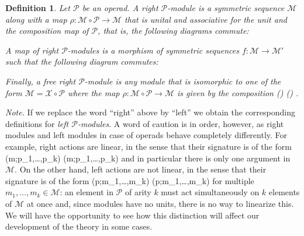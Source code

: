\documentclass[fleqn, a4paper, twoside]{article}
\makeatletter
\newcommand{\0}{\langle 0\rangle}
\newcommand{\XX}{\mathcal{X}}
\let\[\@undefined
\DeclareRobustCommand{\[}{\begin{equation}}%
\let\]\@undefined
\DeclareRobustCommand{\]}{\end{equation}}%
\theoremstyle{mytheorem}
\theoremstyle{introthm}
\theoremstyle{mydefinition}
\newtheorem{definition}[theorem]{Definition}
\theoremstyle{mydefinition2}
\theoremstyle{plain} %
\newcommand{\?}{\,?\,}
\newcommand{\kk}{\Bbbk}
\newcommand{\PP}{{\mathcal{P}}}
\newcommand{\MM}{\mathcal M}
\theoremstyle{mytheorem}
\theoremstyle{plain} %
\makeatother
\begin{document}
\begin{definition}
Let $\PP$ be an operad. A right $\PP$-module is a symmetric
sequence $\MM$ along with a map $\rho :\MM\circ\PP\longrightarrow \MM$
that is unital and associative for the unit and the composition
map of $\PP$, that is, the following diagrams commute:
\[
\qquad
{}
\]
A map of right $\PP$-modules is a morphism
of symmetric sequences $f:\MM\longrightarrow \MM'$ 
such that the following diagram commutes:
\[
\]
Finally, a free right $\PP$-module is any module that is isomorphic
to one of the form $\MM = \XX\circ\PP$ where the map $\rho : \MM\circ\PP
\longrightarrow \MM$ is given by the composition
\[
(\XX\circ \PP)\circ\PP 
\stackrel{\alpha}{\longrightarrow}
\XX \circ (\PP \circ \PP) 
	\stackrel{1\circ\gamma}{\longrightarrow} 
		\XX\circ \PP.
\]
\end{definition}

\emph{Note.} If we replace the word ``right'' above by ``left'' we obtain
the corresponding definitions for \emph{left $\PP$-modules}. A word of
caution is in order, however, as right modules and left modules in
case of operads behave completely differently. For example, right
actions are linear, in the sense that their signature is of the
form
\[
(m;p_1,\ldots,p_k) \longrightarrow \rho(m;p_1,\ldots,p_k)
\] 
and in particular there is only one argument in $\MM$. On the
other hand, left actions are not linear, in the sense that their
signature is of the form
\[
(p;m_1,\ldots,m_k) \longrightarrow \lambda(p;m_1,\ldots,m_k)
\] 
for multiple $m_1,\ldots,m_k\in \MM$: an element in $\PP$
of arity $k$ must act simultaneously on $k$ elements of $\MM$
at once and, since modules have no units, there is no way
to linearize this. We will have the opportunity to see
how this distinction will affect our development of the
theory in some cases.
\end{document}
